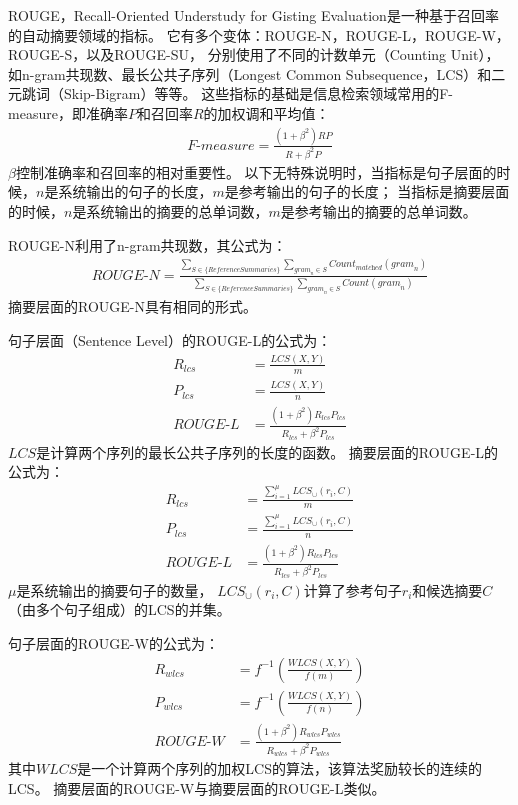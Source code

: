 ROUGE，Recall-Oriented Understudy for Gisting Evaluation是一种基于召回率的自动摘要领域的指标。
它有多个变体：ROUGE-N，ROUGE-L，ROUGE-W，ROUGE-S，以及ROUGE-SU，
分别使用了不同的计数单元（Counting Unit），如n-gram共现数、最长公共子序列（Longest Common Subsequence，LCS）和二元跳词（Skip-Bigram）等等。
这些指标的基础是信息检索领域常用的F-measure，即准确率$P$和召回率$R$的加权调和平均值：
\begin{align}
    \textit{F-measure} = \frac{(1 + \beta^2) RP}{R + \beta^2 P}
\end{align}
$\beta$控制准确率和召回率的相对重要性。
以下无特殊说明时，当指标是句子层面的时候，$n$是系统输出的句子的长度，$m$是参考输出的句子的长度；
当指标是摘要层面的时候，$n$是系统输出的摘要的总单词数，$m$是参考输出的摘要的总单词数。

ROUGE-N利用了n-gram共现数，其公式为：
\begin{align}
    \textit{ROUGE-N} = \frac{
    \sum_{S \in \{\textit{ReferenceSummaries}\}}
    \sum_{\textit{gram}_n \in S}
    \textit{Count}_\textit{matched}(\textit{gram}_n)
    }{
    \sum_{S \in \{\textit{ReferenceSummaries}\}}
    \sum_{\textit{gram}_n \in S}
    \textit{Count}(\textit{gram}_n)
    }
\end{align}
摘要层面的ROUGE-N具有相同的形式。

句子层面（Sentence Level）的ROUGE-L的公式为：
\begin{align}
    R_{lcs} &= \frac{\textit{LCS}(X, Y)}{m} \\
    P_{lcs} &= \frac{\textit{LCS}(X, Y)}{n} \\
    \textit{ROUGE-L} &= \frac{(1 + \beta^2) R_{lcs}P_{lcs}}
    {R_{lcs} + \beta^2 P_{lcs}}
\end{align}
$LCS$是计算两个序列的最长公共子序列的长度的函数。
摘要层面的ROUGE-L的公式为：
\begin{align}
    R_{lcs} &= \frac{\sum_{i=1}^\mu \textit{LCS}_\cup(r_i, C)}{m} \\
    P_{lcs} &= \frac{\sum_{i=1}^\mu \textit{LCS}_\cup(r_i, C)}{n} \\
    \textit{ROUGE-L} &= \frac{(1 + \beta^2) R_{lcs}P_{lcs}}{R_{lcs} + \beta^2 P_{lcs}}
\end{align}
$\mu$是系统输出的摘要句子的数量， $\textit{LCS}_\cup(r_i, C)$计算了参考句子$r_i$和候选摘要$C$（由多个句子组成）的LCS的并集。

句子层面的ROUGE-W的公式为：
\begin{align}
    R_{wlcs} &= f^{-1} \left( \frac{\textit{WLCS}(X, Y)}{f(m)} \right) \\
    P_{wlcs} &= f^{-1} \left( \frac{\textit{WLCS}(X, Y)}{f(n)} \right) \\
    \textit{ROUGE-W} &= \frac{(1 + \beta^2) R_{wlcs}P_{wlcs}}{R_{wlcs} + \beta^2 P_{wlcs}}
\end{align}
其中$\textit{WLCS}$是一个计算两个序列的加权LCS的算法，该算法奖励较长的连续的LCS。
摘要层面的ROUGE-W与摘要层面的ROUGE-L类似。


